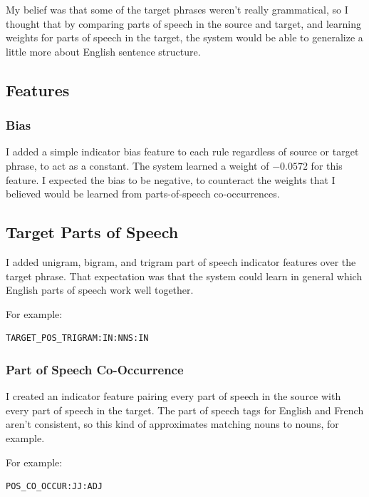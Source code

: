 \documentclass[11pt]{article}
\begin{document}
My belief was that some of the target phrases weren't really grammatical, so I thought that
by comparing parts of speech in the source and target, and learning weights for parts of 
speech in the target, the system would be able to generalize a little more about
English sentence structure.

\subsection{Features}

\subsubsection{Bias}

I added a simple indicator bias feature to each rule regardless of source or target phrase,
to act as a constant.  The system learned a weight of $ -0.0572 $ for this feature.  I expected
the bias to be negative, to counteract the weights that I believed would be learned from
parts-of-speech co-occurrences.

\subsection{Target Parts of Speech}

I added unigram, bigram, and trigram part of speech indicator features over the target phrase.
That expectation was that the system could learn in general which English parts of speech
work well together.

For example:

\begin{verbatim}
TARGET_POS_TRIGRAM:IN:NNS:IN
\end{verbatim}

\subsubsection{Part of Speech Co-Occurrence}

I created an indicator feature pairing every part of speech in the source
with every part of speech in the target.  The part of speech tags for
English and French aren't consistent, so this kind of approximates matching
nouns to nouns, for example.

For example:

\begin{verbatim}
POS_CO_OCCUR:JJ:ADJ
\end{verbatim}
\end{document}
